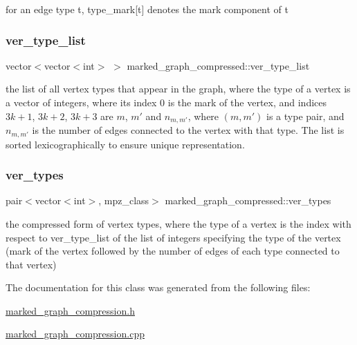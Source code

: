 for an edge type t, type\+\_\+mark\mbox{[}t\mbox{]} denotes the mark component of t 

\mbox{\label{classmarked__graph__compressed_af2e3e55223d436628a02758dfae88493}} 
\subsubsection{\texorpdfstring{ver\+\_\+type\+\_\+list}{ver\_type\_list}}
{\footnotesize\ttfamily vector$<$vector$<$int$>$ $>$ marked\+\_\+graph\+\_\+compressed\+::ver\+\_\+type\+\_\+list}



the list of all vertex types that appear in the graph, where the type of a vertex is a vector of integers, where its index 0 is the mark of the vertex, and indices $3k+1$, $3k+2$, $3k+3$ are $m$, $m'$ and $n_{m,m'}$, where $(m,m')$ is a type pair, and $n_{m,m'}$ is the number of edges connected to the vertex with that type. The list is sorted lexicographically to ensure unique representation. 

\mbox{\label{classmarked__graph__compressed_af446cc5e23c241a92b76642fd5ebc403}} 
\subsubsection{\texorpdfstring{ver\+\_\+types}{ver\_types}}
{\footnotesize\ttfamily pair$<$vector$<$int$>$, mpz\+\_\+class$>$ marked\+\_\+graph\+\_\+compressed\+::ver\+\_\+types}



the compressed form of vertex types, where the type of a vertex is the index with respect to ver\+\_\+type\+\_\+list of the list of integers specifying the type of the vertex (mark of the vertex followed by the number of edges of each type connected to that vertex) 



The documentation for this class was generated from the following files\+:\begin{DoxyCompactItemize}
\item 
\hyperlink{marked__graph__compression_8h}{marked\+\_\+graph\+\_\+compression.\+h}\item 
\hyperlink{marked__graph__compression_8cpp}{marked\+\_\+graph\+\_\+compression.\+cpp}\end{DoxyCompactItemize}
